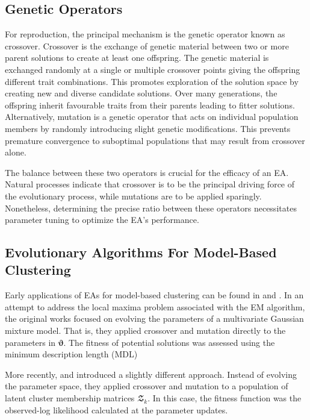 \documentclass[12pt]{report}
\begin{document}
\subsection{Genetic Operators}
For reproduction, the principal mechanism is the genetic operator known as crossover. Crossover is the exchange of genetic material between two or more parent solutions to create at least one offspring. The genetic material is exchanged randomly at a single or multiple crossover points giving the offspring different trait combinations. This promotes exploration of the solution space by creating new and diverse candidate solutions. Over many generations, the offspring inherit favourable traits from their parents leading to fitter solutions. Alternatively, mutation is a genetic operator that acts on individual population members by randomly introducing slight genetic modifications. This prevents premature convergence to suboptimal populations that may result from crossover alone. 

The balance between these two operators is crucial for the efficacy of an EA. Natural processes indicate that crossover is to be the principal driving force of the evolutionary process, while mutations are to be applied sparingly. Nonetheless, determining the precise ratio between these operators necessitates parameter tuning to optimize the EA's performance.




\subsection{Evolutionary Algorithms For Model-Based Clustering}
Early applications of EAs for model-based clustering can be found in \citet{martinez2000} and \citet{pernkopf2005}. In an attempt to address the local maxima problem associated with the EM algorithm, the original works focused on evolving the parameters of a multivariate Gaussian mixture model. That is, they applied crossover and mutation directly to the parameters in $\bm{\vartheta}$. The fitness of potential solutions was assessed using the minimum description length (MDL)

More recently, \citet{andrews2013} and \citet{mcnicholas2020} introduced a slightly different approach. Instead of evolving the parameter space, they applied crossover and mutation to a population of latent cluster membership matrices $\mathbfcal{Z}_k$. In this case, the fitness function was the observed-log likelihood calculated at the parameter updates. 
\end{document}
